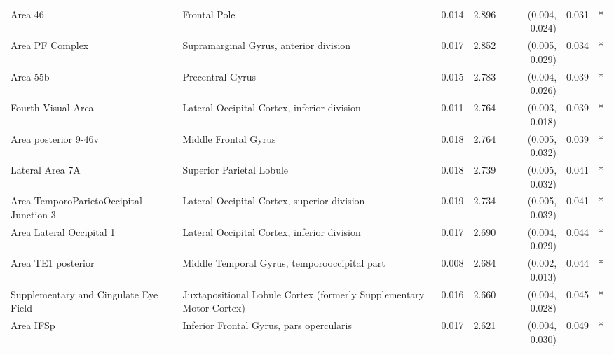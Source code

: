\begin{table}[ht]
{\begin{tabular}{llrrrrl}
Area 46 & Frontal Pole & 0.014 & 2.896 & (0.004, 0.024) & 0.031 & * \\
Area PF Complex & Supramarginal Gyrus, anterior division & 0.017 & 2.852 & (0.005, 0.029) & 0.034 & * \\
Area 55b & Precentral Gyrus & 0.015 & 2.783 & (0.004, 0.026) & 0.039 & * \\
Fourth Visual Area & Lateral Occipital Cortex, inferior division & 0.011 & 2.764 & (0.003, 0.018) & 0.039 & * \\
Area posterior 9-46v & Middle Frontal Gyrus & 0.018 & 2.764 & (0.005, 0.032) & 0.039 & * \\
Lateral Area 7A & Superior Parietal Lobule & 0.018 & 2.739 & (0.005, 0.032) & 0.041 & * \\
Area TemporoParietoOccipital Junction 3 & Lateral Occipital Cortex, superior division & 0.019 & 2.734 & (0.005, 0.032) & 0.041 & * \\
Area Lateral Occipital 1 & Lateral Occipital Cortex, inferior division & 0.017 & 2.690 & (0.004, 0.029) & 0.044 & * \\
Area TE1 posterior & Middle Temporal Gyrus, temporooccipital part & 0.008 & 2.684 & (0.002, 0.013) & 0.044 & * \\
Supplementary and Cingulate Eye Field & Juxtapositional Lobule Cortex (formerly Supplementary Motor Cortex) & 0.016 & 2.660 & (0.004, 0.028) & 0.045 & * \\
Area IFSp & Inferior Frontal Gyrus, pars opercularis & 0.017 & 2.621 & (0.004, 0.030) & 0.049 & * \\
\bottomrule
\end{tabular}
}
\end{table}


